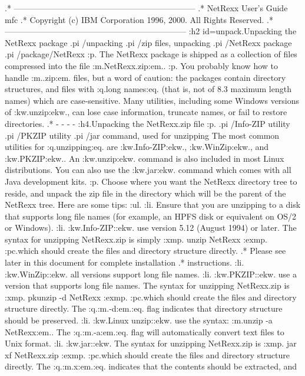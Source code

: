 .* ------------------------------------------------------------------
.* NetRexx User's Guide                                              mfc
.* Copyright (c) IBM Corporation 1996, 2000.  All Rights Reserved.
.* ------------------------------------------------------------------
:h2 id=unpack.Unpacking the NetRexx package
.pi /unpacking
.pi /zip files, unpacking
.pi /NetRexx package
.pi /package/NetRexx
:p.
The NetRexx package is shipped as a collection of files compressed into
the file :m.NetRexx.zip:em..
:p.
You probably know how to handle :m..zip:em. files, but a word of
caution: the packages contain directory structures, and files with
:q.long names:eq. (that is, not of 8.3 maximum length names) which are
case-sensitive.  Many utilities, including some Windows versions of
:kw.unzip:ekw., can lose case information, truncate names, or fail to
restore directories.
.* - - - -
:h4.Unpacking the NetRexx.zip file
:p.
.pi /Info-ZIP utility
.pi /PKZIP utility
.pi /jar command, used for unzipping
The most common utilities for :q.unzipping:eq. are :kw.Info-ZIP:ekw.,
:kw.WinZip:ekw., and :kw.PKZIP:ekw..  An :kw.unzip:ekw. command is also
included in most Linux distributions.
You can also use the :kw.jar:ekw. command which comes with all Java
development kits.
:p.
Choose where you want the NetRexx directory tree to reside, and unpack
the zip file in the directory which will be the parent of the NetRexx
tree.
Here are some tips:
:ul.
:li.
Ensure that you are unzipping to a disk that supports long file names
(for example, an HPFS disk or equivalent on OS/2 or Windows).
:li.
:kw.Info-ZIP::ekw. use version 5.12 (August 1994) or later.  The syntax for
unzipping NetRexx.zip is simply
:xmp.
unzip NetRexx
:exmp.
:pc.which should create the files and directory structure directly.
.* Please see later in this document for complete installation
.* instructions.
:li.
:kw.WinZip::ekw. all versions support long file names.
:li.
:kw.PKZIP::ekw. use a version that supports long file names.  The syntax
for unzipping NetRexx.zip is
:xmp.
pkunzip -d NetRexx
:exmp.
:pc.which should create the files and directory structure directly.  The
:q.:m.-d:em.:eq. flag indicates that directory structure should be
preserved.
:li.
:kw.Linux unzip::ekw. use the syntax: :m.unzip -a NetRexx:em..  The
:q.:m.-a:em.:eq. flag will automatically convert text files to Unix
format.
:li.
:kw.jar::ekw. The syntax for unzipping NetRexx.zip is
:xmp.
jar xf NetRexx.zip
:exmp.
:pc.which should create the files and directory structure directly.
The :q.:m.x:em.:eq. indicates that the contents should be extracted, and
